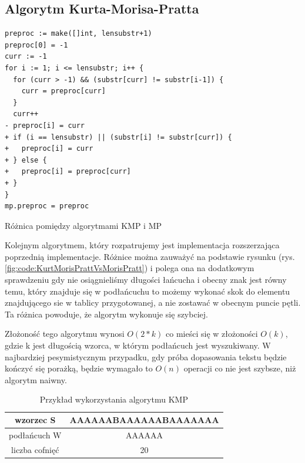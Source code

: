 \subsection{Algorytm Kurta-Morisa-Pratta}

\begin{listing}[H]
    \begin{verbatim}
preproc := make([]int, lensubstr+1)
preproc[0] = -1
curr := -1
for i := 1; i <= lensubstr; i++ {
  for (curr > -1) && (substr[curr] != substr[i-1]) {
    curr = preproc[curr]
  }
  curr++
- preproc[i] = curr
+ if (i == lensubstr) || (substr[i] != substr[curr]) {
+   preproc[i] = curr
+ } else {
+   preproc[i] = preproc[curr]
+ }
}
mp.preproc = preproc
    \end{verbatim}
  \caption{Różnica pomiędzy algorytmami KMP i MP}
  \label{fig:code:KurtMorisPrattVsMorisPratt}
\end{listing}

Kolejnym algorytmem, który rozpatrujemy jest implementacja rozszerzająca 
poprzednią implementacje. Różnice można zauważyć na podstawie rysunku
(rys. \ref{fig:code:KurtMorisPrattVsMorisPratt}) i polega ona na dodatkowym sprawdzeniu
gdy nie osiągnieliśmy długości łańcucha i obecny znak jest równy temu, który 
znajduje się w podłańcuchu to możemy wykonać skok do elementu znajdującego
sie w tablicy przygotowanej, a nie zostawać w obecnym puncie pętli. Ta różnica
powoduje, że algorytm wykonuje się szybciej.

Złożoność tego algorytmu wynosi $O(2*{k})$ co mieści się w złożoności $O({k})$,
gdzie k jest długością wzorca, w którym podłańcuch jest wyszukiwany. W 
najbardziej pesymistycznym przypadku, gdy próba dopasowania tekstu będzie 
kończyć się porażką, będzie wymagało to $O({n})$ operacji co nie jest szybsze,
niż algorytm naiwny. 

\begin{table}
  \centering
  \begin{tabular}{ |c|c|  } 
    \hline
    wzorzec S & AAAAAABAAAAAABAAAAAAA \\
    \hline
    podłańcuch W & AAAAAA \\
    \hline
    liczba cofnięć & 20 \\
    \hline
  \end{tabular}
  \caption{Przykład wykorzystania algorytmu KMP}
  \label{tabela:KMPExampleSlow}
\end{table}

